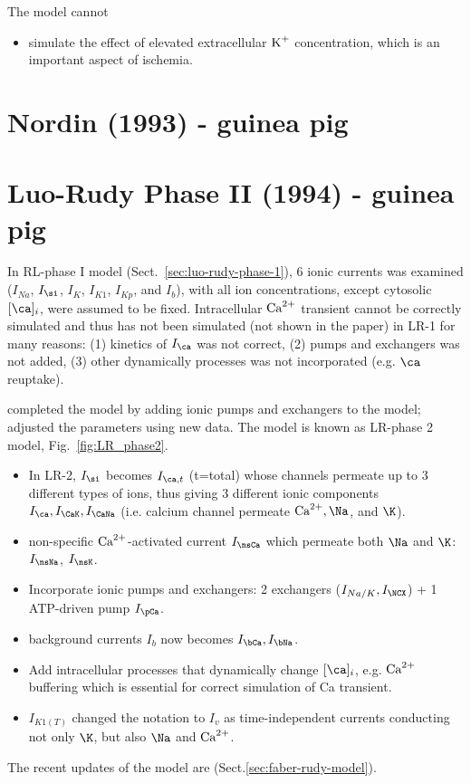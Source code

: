 The model cannot
\begin{itemize}
\item simulate the effect of elevated extracellular $\ce{K+}$
  concentration, which is an important aspect of ischemia. 
\end{itemize}

\section{Nordin (1993) - guinea pig}

\citep{nordin1993cmm}


\section{Luo-Rudy Phase II (1994) - guinea pig}
\label{sec:luo-rudy-phase-2}


In RL-phase I model (Sect.~\ref{sec:luo-rudy-phase-1}), 6 ionic
currents was examined ($I_{Na}$, $I_\si$, $I_{K}$, $I_{K1}$,
$I_{Kp}$, and $I_b$), with all ion concentrations, except cytosolic
$[\ca]_i$, were assumed to be fixed.  Intracellular ${\text{Ca}^{2+}}$
transient cannot be correctly simulated and thus has not been simulated (not
shown in the paper) in LR-1 for many reasons: (1) kinetics of $I_\ca$ was not
correct, (2)  pumps and exchangers was not added, (3) other dynamically
processes  was not incorporated (e.g. $\ca$ reuptake). 

\citep{luo1994dmc_a} completed the model by adding ionic pumps and exchangers to
the model; adjusted the parameters using new data. The model is known as
LR-phase 2 model, Fig.~\ref{fig:LR_phase2}.  
\begin{itemize}
\item In LR-2, $I_\si$ becomes $I_{\ca,t}$ (t=total) whose
  channels permeate up to 3 different types of ions, thus giving 3
  different ionic components $I_\ca, I_\CaK, I_\CaNa$
  (i.e. calcium channel permeate $\Ca,\Na$, and $\K$).
\item non-specific ${\text{Ca}^{2+}}$-activated current $I_\nsCa$ which permeate both
$\Na$ and $\K$: $I_\nsNa$, $I_\nsK$.
\item Incorporate ionic pumps and exchangers: 2 exchangers ($I_{Na/K}, I_\NCX$)
+ 1 ATP-driven pump $I_\pCa$. 
\item background currents $I_b$ now becomes $I_\bCa, I_\bNa$.

\item Add intracellular processes that dynamically change $[\ca]_i$,
  e.g. ${\text{Ca}^{2+}}$ buffering which is essential for correct simulation
  of Ca transient.
  \item $I_{K1(T)}$ changed the notation to $I_v$ as time-independent
  currents conducting not only $\K$, but also $\Na$ and ${\text{Ca}^{2+}}$. 
\end{itemize}
The recent updates of the model are \citep{faber2000}
(Sect.\ref{sec:faber-rudy-model}).

